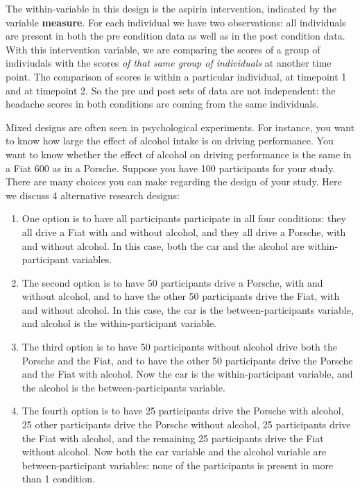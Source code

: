\documentclass[]{report}\usepackage[]{graphicx}\usepackage[]{color}
\begin{document}
The within-variable in this design is the aspirin intervention, indicated by the variable \textbf{measure}. For each individual we have two observations: all individuals are present in both the pre condition data as well as in the post condition data. With this intervention variable, we are comparing the scores of a group of indiviudals with the scores \textit{of that same group of individuals} at another time point. The comparison of scores is within a particular individual, at timepoint 1 and at timepoint 2. So the pre and post sets of data are not independent: the headache scores in both conditions are coming from the same individuals. 

Mixed designs are often seen in psychological experiments. For instance, you want to know how large the effect of alcohol intake is on driving performance. You want to know whether the effect of alcohol on driving performance is the same in a Fiat 600 as in a Porsche. Suppose you have 100 participants for your study. There are many choices you can make regarding the design of your study. Here we discuss 4 alternative research designs:

\begin{enumerate}


\item One option is to have all participants participate in all four conditions: they all drive a Fiat with and without alcohol, and they all drive a Porsche, with and without alcohol. In this case, both the car and the alcohol are within-participant variables.

\item The second option is to have 50 participants drive a Porsche, with and without alcohol, and to have the other 50 participants drive the Fiat, with and without alcohol. In this case, the car is the between-participants variable, and alcohol is the within-participant variable. 

\item The third option is to have 50 participants without alcohol drive both the Porsche and the Fiat, and to have the other 50 participants drive the Porsche and the Fiat with alcohol. Now the car is the within-participant variable, and the alcohol is the between-participants variable.

\item The fourth option is to have 25 participants drive the Porsche with alcohol, 25 other participants drive the Porsche without alcohol, 25 participants drive the Fiat with alcohol, and the remaining 25 participants drive the Fiat without alcohol. Now both the car variable and the alcohol variable are between-participant variables: none of the participants is present in more than 1 condition.

\end{enumerate}
\end{document}
